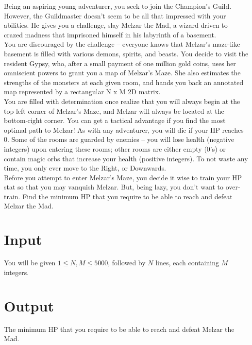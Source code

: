 
Being an aspiring young adventurer, you seek to join the Champion’s Guild. However, the Guildmaster doesn’t seem to be
all that impressed with your abilities. He gives you a challenge, slay Melzar the Mad, a wizard driven to crazed
madness that imprisoned himself in his labyrinth of a basement. \\

You are discouraged by the challenge – everyone knows that Melzar’s maze-like basement is filled with various demons,
spirits, and beasts. You decide to visit the resident Gypsy, who, after a small payment of one million gold coins, uses
her omniscient powers to grant you a map of Melzar’s Maze. She also estimates the strengths of the monsters at each
given room, and hands you back an annotated map represented by a rectangular N x M 2D matrix. \\

You are filled with determination once realize that you will always begin at the top-left corner of Melzar’s Maze, and
Melzar will always be located at the bottom-right corner. You can get a tactical advantage if you find the most optimal
path to Melzar! As with any adventurer, you will die if your HP reaches 0. Some of the rooms are guarded by enemies –
you will lose health (negative integers) upon entering these rooms; other rooms are either empty (0's) or contain magic
orbs that increase your health (positive integers). To not waste any time, you only ever move to the Right,
or Downwards. \\

Before you attempt to enter Melzar’s Maze, you decide it wise to train your HP stat so that you may vanquish Melzar.
But, being lazy, you don’t want to over-train. Find the minimum HP that you require to be able to reach and defeat
Melzar the Mad.

\section*{Input}
You will be given $1 \leq N,M \leq 5000$, followed by $N$ lines, each containing $M$  integers.
\section*{Output}
The minimum HP that you require to be able to reach and defeat Melzar the Mad.
